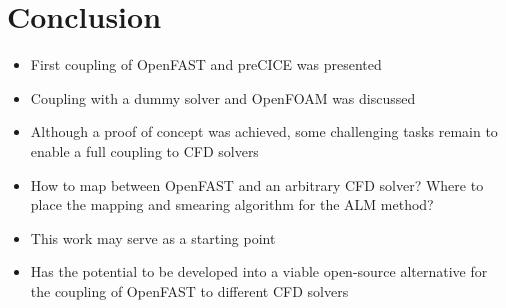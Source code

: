 \section{Conclusion}
\label{section:conclusion}

\begin{itemize}
	\item First coupling of OpenFAST and preCICE was presented
	\item Coupling with a dummy solver and OpenFOAM was discussed
	\item Although a proof of concept was achieved, some challenging tasks remain to enable a full coupling to CFD solvers
	\item How to map between OpenFAST and an arbitrary CFD solver? Where to place the mapping and smearing algorithm for the ALM method?
	\item This work may serve as a starting point
	\item Has the potential to be developed into a viable open-source alternative for the coupling of OpenFAST to different CFD solvers
\end{itemize}
